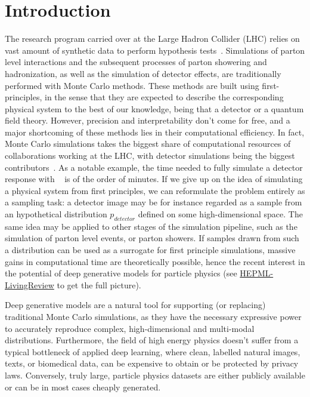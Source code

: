 %
%
%

\chapter{Introduction}\label{chap:introduction}
\enlargethispage{2ex}
\vspace*{-2pt}

The research program carried over at the Large Hadron Collider (LHC) relies on vast amount of synthetic data to perform hypothesis tests~\cite{Apostolakis:2308666, Aarrestad:2729448, Calafiura:2729668, ATL-SOFT-PUB-2018-002}. Simulations of parton level interactions and the subsequent processes of parton showering and hadronization, as well as the simulation of detector effects, are traditionally performed with Monte Carlo methods. These methods are built using first-principles, in the sense that they are expected to describe the corresponding physical system to the best of our knowledge, being that a detector or a quantum field theory. 
However, precision and interpretability don't come for free, and a major shortcoming of these methods lies in their computational efficiency. In fact, Monte Carlo simulations takes the biggest share of computational resources of collaborations working at the LHC, with detector simulations being the biggest contributors~\cite{Calafiura:2729668}. As a notable example, the time needed to fully simulate a detector response with \geant~\cite{AGOSTINELLI2003250} is of the order of minutes.
If we give up on the idea of simulating a physical system from first principles, we can reformulate the problem entirely as a sampling task: a detector image may be for instance regarded as a sample from an hypothetical distribution $p_{detector}$ defined on some high-dimensional space. The same idea may be applied to other stages of the simulation pipeline, such as the simulation of parton level events, or parton showers.
If samples drawn from such a distribution can be used as a surrogate for first principle simulations, massive gains in computational time are theoretically possible, hence the recent interest in the potential of deep generative models for particle physics (see \href{https://iml-wg.github.io/HEPML-LivingReview}{HEPML-LivingReview} to get the full picture).

Deep generative models are a natural tool for supporting  (or replacing) traditional Monte Carlo simulations, as they have the necessary expressive power to accurately reproduce complex, high-dimensional and multi-modal distributions. Furthermore, the field of high energy physics doesn't suffer from a typical bottleneck of applied deep learning, where clean, labelled natural images, texts, or biomedical data, can be expensive to obtain or be protected by privacy laws. Conversely, truly large, particle physics datasets are either publicly available or can be in most cases cheaply generated.

